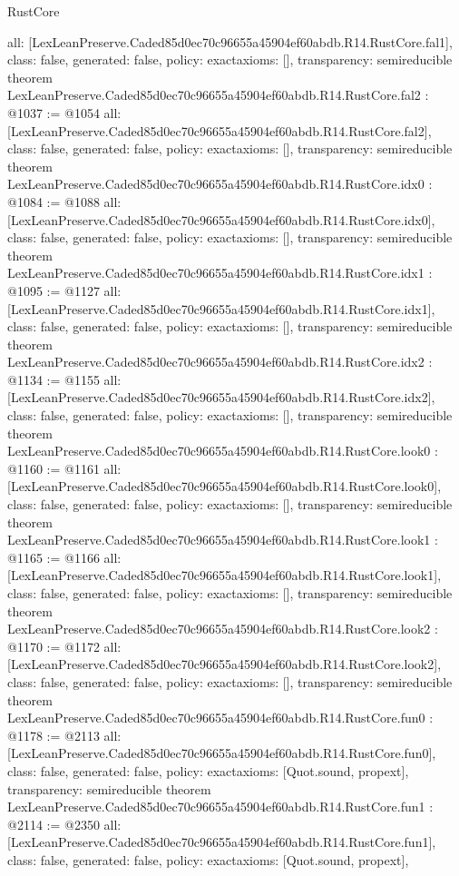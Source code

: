 \begin{lexlean}{RustCore}
\begin{coremodule}
{  all: [LexLeanPreserve.Caded85d0ec70c96655a45904ef60abdb.R14.RustCore.fal1],
  class: false,
  generated: false,
  policy: exact{axioms: []},
  transparency: semireducible
}
theorem LexLeanPreserve.Caded85d0ec70c96655a45904ef60abdb.R14.RustCore.fal2 : @1037 := @1054 {
  all: [LexLeanPreserve.Caded85d0ec70c96655a45904ef60abdb.R14.RustCore.fal2],
  class: false,
  generated: false,
  policy: exact{axioms: []},
  transparency: semireducible
}
theorem LexLeanPreserve.Caded85d0ec70c96655a45904ef60abdb.R14.RustCore.idx0 : @1084 := @1088 {
  all: [LexLeanPreserve.Caded85d0ec70c96655a45904ef60abdb.R14.RustCore.idx0],
  class: false,
  generated: false,
  policy: exact{axioms: []},
  transparency: semireducible
}
theorem LexLeanPreserve.Caded85d0ec70c96655a45904ef60abdb.R14.RustCore.idx1 : @1095 := @1127 {
  all: [LexLeanPreserve.Caded85d0ec70c96655a45904ef60abdb.R14.RustCore.idx1],
  class: false,
  generated: false,
  policy: exact{axioms: []},
  transparency: semireducible
}
theorem LexLeanPreserve.Caded85d0ec70c96655a45904ef60abdb.R14.RustCore.idx2 : @1134 := @1155 {
  all: [LexLeanPreserve.Caded85d0ec70c96655a45904ef60abdb.R14.RustCore.idx2],
  class: false,
  generated: false,
  policy: exact{axioms: []},
  transparency: semireducible
}
theorem LexLeanPreserve.Caded85d0ec70c96655a45904ef60abdb.R14.RustCore.look0 : @1160 := @1161 {
  all: [LexLeanPreserve.Caded85d0ec70c96655a45904ef60abdb.R14.RustCore.look0],
  class: false,
  generated: false,
  policy: exact{axioms: []},
  transparency: semireducible
}
theorem LexLeanPreserve.Caded85d0ec70c96655a45904ef60abdb.R14.RustCore.look1 : @1165 := @1166 {
  all: [LexLeanPreserve.Caded85d0ec70c96655a45904ef60abdb.R14.RustCore.look1],
  class: false,
  generated: false,
  policy: exact{axioms: []},
  transparency: semireducible
}
theorem LexLeanPreserve.Caded85d0ec70c96655a45904ef60abdb.R14.RustCore.look2 : @1170 := @1172 {
  all: [LexLeanPreserve.Caded85d0ec70c96655a45904ef60abdb.R14.RustCore.look2],
  class: false,
  generated: false,
  policy: exact{axioms: []},
  transparency: semireducible
}
theorem LexLeanPreserve.Caded85d0ec70c96655a45904ef60abdb.R14.RustCore.fun0 : @1178 := @2113 {
  all: [LexLeanPreserve.Caded85d0ec70c96655a45904ef60abdb.R14.RustCore.fun0],
  class: false,
  generated: false,
  policy: exact{axioms: [Quot.sound, propext]},
  transparency: semireducible
}
theorem LexLeanPreserve.Caded85d0ec70c96655a45904ef60abdb.R14.RustCore.fun1 : @2114 := @2350 {
  all: [LexLeanPreserve.Caded85d0ec70c96655a45904ef60abdb.R14.RustCore.fun1],
  class: false,
  generated: false,
  policy: exact{axioms: [Quot.sound, propext]},
}
\end{coremodule}
\end{lexlean}
